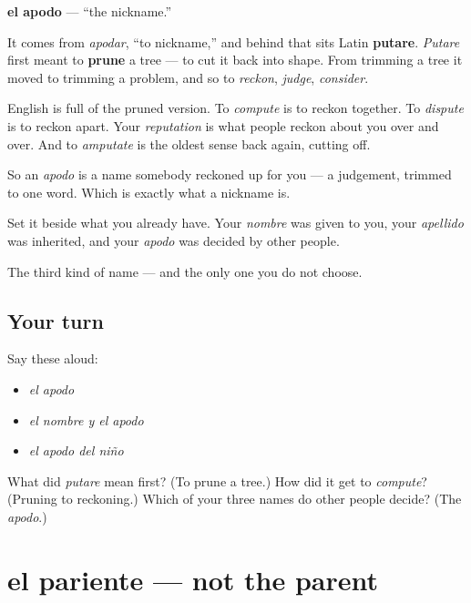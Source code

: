 \begin{cousinweb}
\textbf{el apodo} --- \textquotedblleft{}the nickname.\textquotedblright{}

It comes from \emph{apodar}, \textquotedblleft{}to nickname,\textquotedblright{} and behind that sits Latin \textbf{putare}. \emph{Putare} first meant to \textbf{prune} a tree --- to cut it back into shape. From trimming a tree it moved to trimming a problem, and so to \emph{reckon}, \emph{judge}, \emph{consider}.

English is full of the pruned version. To \emph{compute} is to reckon together. To \emph{dispute} is to reckon apart. Your \emph{reputation} is what people reckon about you over and over. And to \emph{amputate} is the oldest sense back again, cutting off.

So an \emph{apodo} is a name somebody reckoned up for you --- a judgement, trimmed to one word. Which is exactly what a nickname is.

Set it beside what you already have. Your \emph{nombre} was given to you, your \emph{apellido} was inherited, and your \emph{apodo} was decided by other people.
\end{cousinweb}

\begin{grammarlens}[title={What you've built}]
The third kind of name --- and the only one you do not choose.
\end{grammarlens}

\subsection*{Your turn}
Say these aloud:

\begin{itemize}
\raggedright
  \item \emph{el apodo}
  \item \emph{el nombre y el apodo}
  \item \emph{el apodo del niño}
\end{itemize}

\begin{tcolorbox}[breakable,colback=teal!4,colframe=teal!35!black,title={Before you move on}]
What did \emph{putare} mean first? (To prune a tree.) How did it get to \emph{compute}? (Pruning to reckoning.) Which of your three names do other people decide? (The \emph{apodo}.)
\end{tcolorbox}
\section[el pariente]{el pariente --- not the parent}

